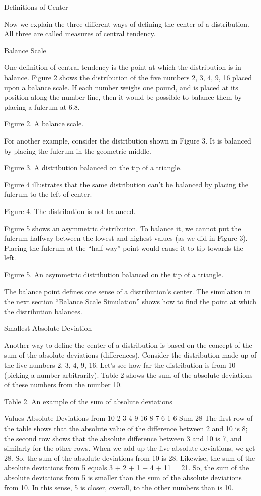\documentclass[
]{book}
\begin{document}
Definitions of Center

Now we explain the three different ways of defining the center of a distribution. All three are called measures of central tendency.

Balance Scale

One definition of central tendency is the point at which the distribution is in balance. Figure 2 shows the distribution of the five numbers 2, 3, 4, 9, 16 placed upon a balance scale. If each number weighs one pound, and is placed at its position along the number line, then it would be possible to balance them by placing a fulcrum at 6.8.

Figure 2. A balance scale.

For another example, consider the distribution shown in Figure 3. It is balanced by placing the fulcrum in the geometric middle.

Figure 3. A distribution balanced on the tip of a triangle.

Figure 4 illustrates that the same distribution can't be balanced by placing the fulcrum to the left of center.

Figure 4. The distribution is not balanced.

Figure 5 shows an asymmetric distribution. To balance it, we cannot put the fulcrum halfway between the lowest and highest values (as we did in Figure 3). Placing the fulcrum at the ``half way'' point would cause it to tip towards the left.

Figure 5. An asymmetric distribution balanced on the tip of a triangle.

The balance point defines one sense of a distribution's center. The simulation in the next section ``Balance Scale Simulation'' shows how to find the point at which the distribution balances.

Smallest Absolute Deviation

Another way to define the center of a distribution is based on the concept of the sum of the absolute deviations (differences). Consider the distribution made up of the five numbers 2, 3, 4, 9, 16. Let's see how far the distribution is from 10 (picking a number arbitrarily). Table 2 shows the sum of the absolute deviations of these numbers from the number 10.

Table 2. An example of the sum of absolute deviations

Values Absolute Deviations from 10
2
3
4
9
16 8
7
6
1
6
Sum 28
The first row of the table shows that the absolute value of the difference between 2 and 10 is 8; the second row shows that the absolute difference between 3 and 10 is 7, and similarly for the other rows. When we add up the five absolute deviations, we get 28. So, the sum of the absolute deviations from 10 is 28. Likewise, the sum of the absolute deviations from 5 equals 3 + 2 + 1 + 4 + 11 = 21. So, the sum of the absolute deviations from 5 is smaller than the sum of the absolute deviations from 10. In this sense, 5 is closer, overall, to the other numbers than is 10.
\end{document}
